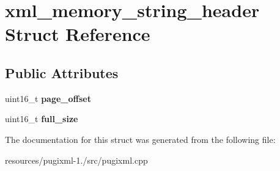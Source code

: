 \hypertarget{structxml__memory__string__header}{\section{xml\+\_\+memory\+\_\+string\+\_\+header Struct Reference}
\label{structxml__memory__string__header}
}
\subsection*{Public Attributes}
\begin{DoxyCompactItemize}
\item 
\hypertarget{structxml__memory__string__header_a0cc274672f1263f73eeb6bf839bf96ee}{uint16\+\_\+t {\bfseries page\+\_\+offset}}\label{structxml__memory__string__header_a0cc274672f1263f73eeb6bf839bf96ee}

\item 
\hypertarget{structxml__memory__string__header_abbb48a709081e6610dffad322499e3f7}{uint16\+\_\+t {\bfseries full\+\_\+size}}\label{structxml__memory__string__header_abbb48a709081e6610dffad322499e3f7}

\end{DoxyCompactItemize}


The documentation for this struct was generated from the following file\+:\begin{DoxyCompactItemize}
\item 
resources/pugixml-\/1./src/pugixml.\+cpp\end{DoxyCompactItemize}
